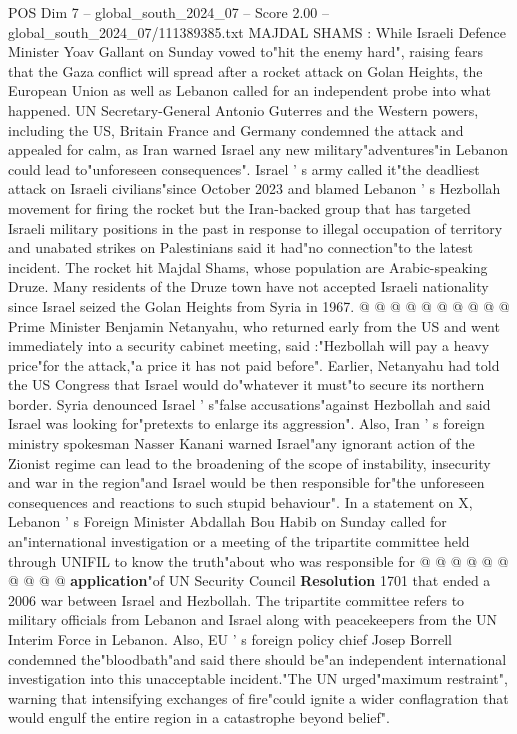 \begin{textsample}{POS Dim 7 – global\_south\_2024\_07 – Score 2.00 – global\_south\_2024\_07/111389385.txt}  \label{ex:f7_pos_110}
MAJDAL SHAMS : While Israeli Defence Minister Yoav Gallant on Sunday vowed to"hit the enemy hard", raising fears that the Gaza conflict will spread after a rocket attack on Golan Heights, the European Union as well as Lebanon called for an independent probe into what happened.
UN Secretary-General Antonio Guterres and the Western powers, including the US, Britain France and Germany condemned the attack and appealed for calm, as Iran warned Israel any new military"adventures"in Lebanon could lead to"unforeseen consequences".
Israel ' s army called it"the deadliest attack on Israeli civilians"since October 2023 and blamed Lebanon ' s Hezbollah movement for firing the rocket but the Iran-backed group that has targeted Israeli military positions in the past in response to illegal occupation of territory and unabated strikes on Palestinians said it had"no connection"to the latest incident.
The rocket hit Majdal Shams, whose population are Arabic-speaking Druze.
Many residents of the Druze town have not accepted Israeli nationality since Israel seized the Golan Heights from Syria in 1967. @ @ @ @ @ @ @ @ @ @ Prime Minister Benjamin Netanyahu, who returned early from the US and went immediately into a security cabinet meeting, said :"Hezbollah will pay a heavy price"for the attack,"a price it has not paid before".
Earlier, Netanyahu had told the US Congress that Israel would do"whatever it must"to secure its northern border.
Syria denounced Israel ' s"false accusations"against Hezbollah and said Israel was looking for"pretexts to enlarge its aggression".
Also, Iran ' s foreign ministry spokesman Nasser Kanani warned Israel"any ignorant action of the Zionist regime can lead to the broadening of the scope of instability, insecurity and war in the region"and Israel would be then responsible for"the unforeseen consequences and reactions to such stupid behaviour".
In a statement on X, Lebanon ' s Foreign Minister Abdallah Bou Habib on Sunday called for an"international investigation or a meeting of the tripartite committee held through UNIFIL to know the truth"about who was responsible for @ @ @ @ @ @ @ @ @ @ \textbf{application}"of UN Security Council \textbf{Resolution} 1701 that ended a 2006 war between Israel and Hezbollah.
The tripartite committee refers to military officials from Lebanon and Israel along with peacekeepers from the UN Interim Force in Lebanon.
Also, EU ' s foreign policy chief Josep Borrell condemned the"bloodbath"and said there should be"an independent international investigation into this unacceptable incident."The UN urged"maximum restraint", warning that intensifying exchanges of fire"could ignite a wider conflagration that would engulf the entire region in a catastrophe beyond belief".

\end{textsample}

